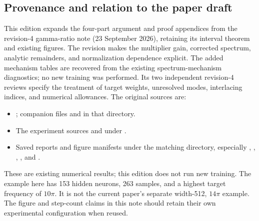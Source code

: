 \documentclass[11pt]{article}
\begin{document}
\subsection{Provenance and relation to the paper draft}
This edition expands the four-part argument and proof appendices from the revision-4 gamma-ratio note (23 September 2026), retaining its interval theorem and existing figures. The revision makes the multiplier gain, corrected spectrum, analytic remainders, and normalization dependence explicit. The added mechanism tables are recovered from the existing spectrum-mechanism diagnostics; no new training was performed. Its two independent revision-4 reviews specify the treatment of target weights, unresolved modes, interlacing indices, and numerical allowances. The original sources are:
\begin{itemize}\raggedright
\item {}; companion files  and  in that directory.
\item The experiment sources  and  under .
\item Saved reports and figure manifests under the matching  directory, especially , , , , and .
\end{itemize}
These are existing numerical results; this edition does not run new training. The example here has 153 hidden neurons, 263 samples, and a highest target frequency of $10\pi$. It is not the current paper's separate width-512, $14\pi$ example. The figure and step-count claims in this note should retain their own experimental configuration when reused.
\end{document}
